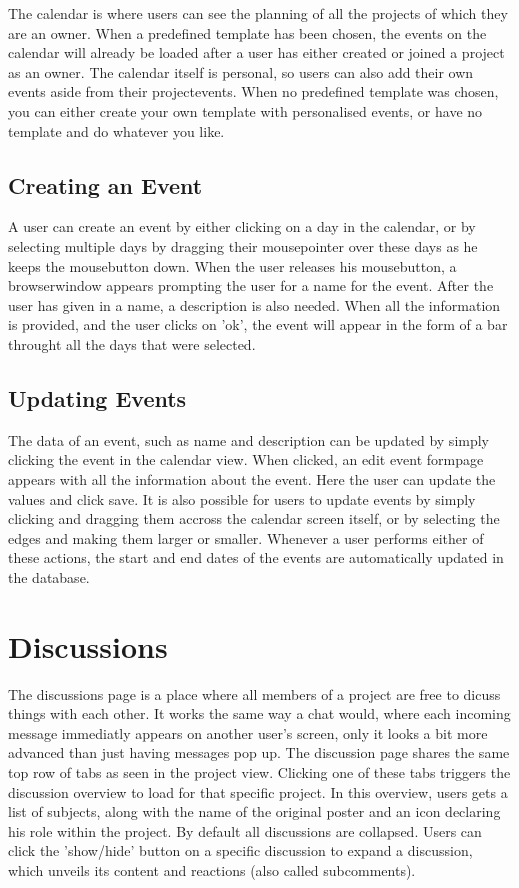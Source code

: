 The calendar is where users can see the planning of all the projects of which they are an owner.
When a predefined template has been chosen, the events on the calendar will already be loaded after
a user has either created or joined a project as an owner. The calendar itself is personal, so users can also add their own events aside from their 
projectevents. When no predefined template was chosen, you can either
create your own template with personalised events, or have no template and do whatever you like.

\subsection{Creating an Event}

A user can create an event by either clicking on a day in the calendar, or by selecting multiple days by dragging their mousepointer over these days
as he keeps the mousebutton down. When the user releases his mousebutton, a browserwindow appears prompting the user for a name for the event. After
the user has given in a name, a description is also needed. When all the information is provided, and the user clicks on 'ok', the event will appear
in the form of a bar throught all the days that were selected.

\subsection{Updating Events}

The data of an event, such as name and description can be updated by simply clicking the event in the calendar view. When clicked, an edit event 
formpage appears with all the information about the event. Here the user can update the values and click save. It is also possible for users
to update events by simply clicking and dragging them accross the calendar screen itself, or by selecting the edges and making them larger or
smaller. Whenever a user performs either of these actions, the start and end dates of the events are automatically updated in the database.

\section{Discussions}

The discussions page is a place where all members of a project are free to dicuss things with each other. It works the same way a chat would, where
each incoming message immediatly appears on another user's screen, only it looks a bit more advanced than just having messages pop up.
The discussion page shares the same top row of tabs as seen in the project view. Clicking one of these tabs
triggers the discussion overview to load for that specific project. In this overview, users gets a
list of subjects, along with the name of the original poster and an icon declaring his role within the project. 
By default all discussions are collapsed. Users can click the 'show/hide' button on a specific discussion to 
expand a discussion, which unveils its content and reactions (also called subcomments).

